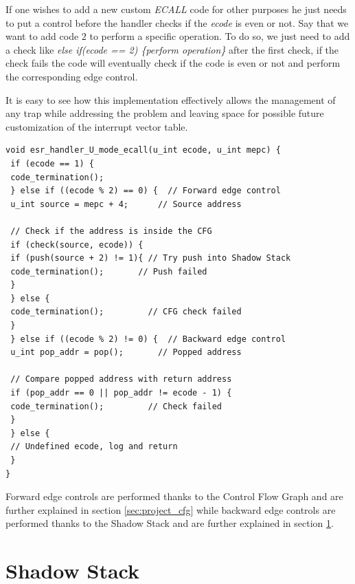 If one wishes to add a new custom \textit{ECALL} code for other purposes he just
needs to put a control before the handler checks if the \textit{ecode} is even or
not. Say that we want to add code $2$ to perform a specific operation. To do so,
we just need to add a check like \textit{else if(ecode == 2) \{perform operation\}}
after the first check, if the check fails the code will eventually check if the
code is even or not and perform the corresponding edge control.

It is easy to see how this implementation effectively allows the management of
any trap while addressing the problem and leaving space for possible future
customization of the interrupt vector table. \\ \begin{lstlisting}[style=CStyle, caption = U-mode \textit{ECALL} handler, label={lst:ecallhandler}]
void esr_handler_U_mode_ecall(u_int ecode, u_int mepc) {
 if (ecode == 1) {
 code_termination();
 } else if ((ecode % 2) == 0) {  // Forward edge control
 u_int source = mepc + 4;      // Source address

 // Check if the address is inside the CFG
 if (check(source, ecode)) {
 if (push(source + 2) != 1){ // Try push into Shadow Stack
 code_termination();       // Push failed
 }
 } else {
 code_termination();         // CFG check failed
 }
 } else if ((ecode % 2) != 0) {  // Backward edge control
 u_int pop_addr = pop();       // Popped address

 // Compare popped address with return address
 if (pop_addr == 0 || pop_addr != ecode - 1) {
 code_termination();         // Check failed
 }
 } else {
 // Undefined ecode, log and return
 }
}
\end{lstlisting}

Forward edge controls are performed thanks to the Control Flow Graph and are
further explained in section \ref{sec:project_cfg} while backward edge controls
are performed thanks to the Shadow Stack and are further explained in section
\ref{sec:project_ss}.

\section{Shadow Stack}
\label{sec:project_ss}

